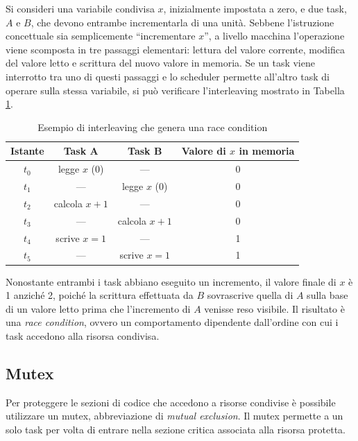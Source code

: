 \vspace{.25cm}

Si consideri una variabile condivisa $x$, inizialmente impostata a zero, e
due task, $A$ e $B$, che devono entrambe incrementarla di una unità.
Sebbene l'istruzione concettuale sia semplicemente ``incrementare $x$'', a
livello macchina l'operazione viene scomposta in tre passaggi elementari:
lettura del valore corrente, modifica del valore letto e scrittura del
nuovo valore in memoria. Se un task viene interrotto tra uno di questi
passaggi e lo scheduler permette all'altro task di operare sulla stessa
variabile, si può verificare l'interleaving mostrato in Tabella
\ref{tab:race-condition}.

\begin{table}[H]
    \centering
    \begin{tabular}{cccc}
        \hline
        \textbf{Istante} & \textbf{Task A} & \textbf{Task B} & \textbf{Valore di $x$ in memoria} \\
        \hline
        $t_0$ & legge $x$ (0) & --- & 0 \\ \hline
        $t_1$ & --- & legge $x$ (0) & 0 \\ \hline
        $t_2$ & calcola $x+1$ & --- & 0 \\ \hline
        $t_3$ & --- & calcola $x+1$ & 0 \\ \hline
        $t_4$ & scrive $x = 1$ & --- & 1 \\ \hline
        $t_5$ & --- & scrive $x = 1$ & 1 \\ \hline
    \end{tabular}
    \caption{Esempio di interleaving che genera una race condition}
    \label{tab:race-condition}
\end{table}

Nonostante entrambi i task abbiano eseguito un incremento, il valore
finale di $x$ è 1 anziché 2, poiché la scrittura effettuata da $B$
sovrascrive quella di $A$ sulla base di un valore letto prima che
l'incremento di $A$ venisse reso visibile. Il risultato è una \textit{race
condition}, ovvero un comportamento dipendente dall'ordine con cui i task
accedono alla risorsa condivisa.

\subsection{Mutex}
Per proteggere le sezioni di codice che accedono a risorse condivise è
possibile utilizzare un mutex, abbreviazione di \textit{mutual exclusion}.
Il mutex permette a un solo task per volta di entrare nella sezione critica
associata alla risorsa protetta.

